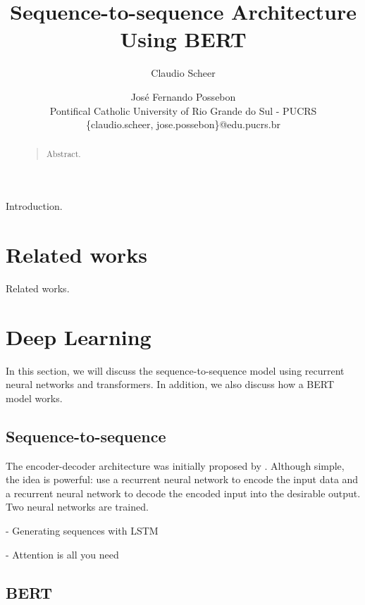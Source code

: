 \documentclass[letterpaper]{article}
\begin{document}
%
\title{Sequence-to-sequence Architecture\\Using BERT}
\author{Claudio Scheer \and Jos\'e Fernando Possebon\\
    Pontifical Catholic University of Rio Grande do Sul - PUCRS\\
    \{claudio.scheer, jose.possebon\}@edu.pucrs.br
}

\maketitle

\begin{abstract}
    \begin{quote}
        Abstract.
    \end{quote}
\end{abstract}

\noindent Introduction.


\section{Related works}
Related works.


\section{Deep Learning}

In this section, we will discuss the sequence-to-sequence model using recurrent neural networks and transformers. In addition, we also discuss how a BERT model works.

\subsection{Sequence-to-sequence}

The encoder-decoder architecture was initially proposed by \cite{DBLP:journals/corr/ChoMGBSB14}. Although simple, the idea is powerful: use a recurrent neural network to encode the input data and a recurrent neural network to decode the encoded input into the desirable output. Two neural networks are trained.

\cite{DBLP:journals/corr/Graves13} - Generating sequences with LSTM

- Attention is all you need


\subsection{BERT}
\end{document}
